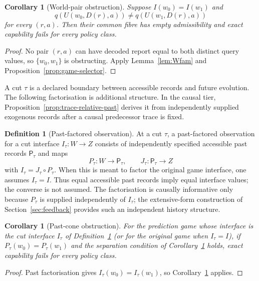 \documentclass[11pt]{article}
\theoremstyle{plain}
\newtheorem{corollary}[theorem]{Corollary}
\theoremstyle{definition}
\newtheorem{definition}[theorem]{Definition}
\theoremstyle{remark}
\begin{document}
\begin{corollary}[World-pair obstruction]\label{cor:worldpair}
Suppose $I(w_0)=I(w_1)$ and
\[
q(U(w_0,D(r),a))\ne q(U(w_1,D(r),a))
\]
for every $(r,a)$. Then their common fibre has empty admissibility and exact
capability fails for every policy class.
\end{corollary}

\begin{proof}
No pair $(r,a)$ can have decoded report equal to both distinct query values, so
$\{w_0,w_1\}$ is obstructing. Apply Lemma~\ref{lem:Wfam} and
Proposition~\ref{prop:game-selector}.
\end{proof}

A cut $\tau$ is a declared boundary between accessible records and future
evolution. The following factorisation is additional structure. In the causal
tier, Proposition~\ref{prop:trace-relative-past} derives it from independently
supplied exogenous records after a causal predecessor trace is fixed.

\begin{definition}[Past-factored observation]\label{def:past-factor}
At a cut $\tau$, a past-factored observation for a cut interface
$I_\tau:W\to Z$ consists of independently specified accessible past
records $\mathsf P_\tau$ and maps
\[
P_\tau:W\to\mathsf P_\tau,\qquad J_\tau:\mathsf P_\tau\to Z
\]
with $I_\tau=J_\tau\circ P_\tau$. When this is meant to factor the original
game interface, one assumes $I_\tau=I$. Thus equal accessible past records imply
equal interface values; the converse is not assumed. The factorisation is causally
informative only because $P_\tau$ is supplied independently of $I_\tau$; the
extensive-form construction of Section~\ref{sec:feedback} provides such an
independent history structure.
\end{definition}

\begin{corollary}[Past-cone obstruction]\label{cor:pastcone}
For the prediction game whose interface is the cut interface $I_\tau$ of Definition~\ref{def:past-factor}
(or for the original game when $I_\tau=I$), if $P_\tau(w_0)=P_\tau(w_1)$ and
the separation condition of Corollary~\ref{cor:worldpair} holds, exact
capability fails for every policy class.
\end{corollary}

\begin{proof}
Past factorisation gives $I_\tau(w_0)=I_\tau(w_1)$, so
Corollary~\ref{cor:worldpair} applies.
\end{proof}
\end{document}
